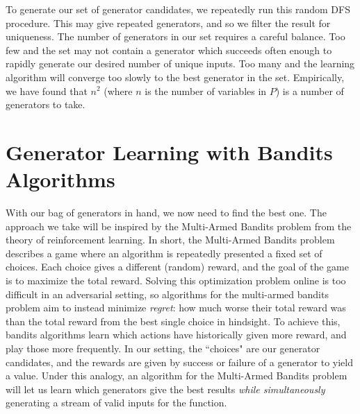 \documentclass[sigconf,nonacm]{acmart}
\begin{document}
      

      
      

To generate our set of generator candidates, we repeatedly run this random DFS procedure.
This may give repeated generators, and so we filter the result for uniqueness.
The number of generators in our set requires a careful
balance. Too few and the set may not contain a generator which succeeds often
enough to rapidly generate our desired number of unique inputs. Too many and the
learning algorithm will converge too slowly to the best generator in the set.
Empirically, we have found that $n^2$ (where $n$ is the number of variables in
$P$) is a number of generators to take.

\section{Generator Learning with Bandits Algorithms}
\label{sec:bandits}
With our bag of generators in hand, we now need to find the best one. The
approach we take will be inspired by the Multi-Armed Bandits
\cite{gittins1979bandit} problem from the theory of reinforcement learning. In short, the Multi-Armed
Bandits problem describes a game where an algorithm is repeatedly presented
a fixed set of choices. Each choice gives a different (random) reward, and the
goal of the game is to maximize the total reward. Solving this optimization problem
online is too difficult in an adversarial setting, so algorithms for the multi-armed
bandits problem aim to instead minimize \emph{regret}: how much worse their total reward
was than the total reward from the best single choice in hindsight. To achieve this, bandits algorithms
learn which actions have historically given more reward, and play those more frequently.
In our setting, the ``choices" are our
generator candidates, and the rewards are given by success or failure of a
generator to yield a value. Under this analogy, an algorithm for the Multi-Armed
Bandits problem will let us learn which generators give the best results
\textit{while simultaneously} generating a stream of valid inputs for the
function.
\end{document}
